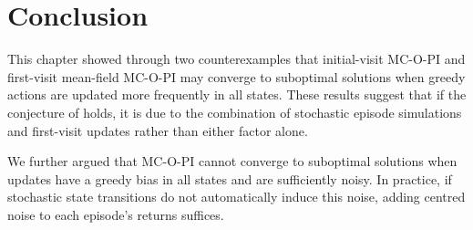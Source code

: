 
\vspace{-0.4cm}
\section{Conclusion}
\vspace{-0.4cm}

This chapter showed through two counterexamples that initial-visit MC-O-PI and first-visit mean-field MC-O-PI may converge to suboptimal solutions when greedy actions are updated more frequently in all states.
These results suggest that if the conjecture of \citet[p. 99]{Sutton2018ReinforcementIntroduction} holds, it is due to the combination of stochastic episode simulations and first-visit updates rather than either factor alone.

\vspace{-0.1cm}

We further argued that MC-O-PI cannot converge to suboptimal solutions when updates have a greedy bias in all states and are sufficiently noisy.
In practice, if stochastic state transitions do not automatically induce this noise,
adding centred noise to each episode's returns suffices.





\clearpage